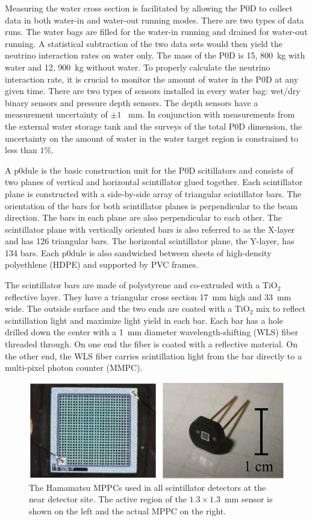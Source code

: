 Measuring the water cross section is facilitated by allowing the P0D to collect
data in both water-in and water-out running modes. There are two types of data runs. The water bags are filled
for the water-in running and drained for water-out running. A
statistical subtraction of the two data sets would then yield the neutrino
interaction rates on water only. The mass of the P0D is 15, 800~kg
with water and 12, 900~kg without water. To properly calculate the
neutrino interaction rate, it is crucial to monitor the
amount of water in the P0D at any given time. There are two types of
sensors installed in every water bag: wet/dry binary sensors and pressure depth
sensors. The depth sensors have a measurement uncertainty of $\pm
1$ ~mm. In conjunction with measurements from the external water
storage tank and the surveys of the total P0D dimension, the
uncertainty on the amount of water in the water target region is
constrained to less than $1\%$.

A p0dule is the basic
construction unit for the P0D scitillators and consists of two planes of vertical and horizontal
scintillator glued together. Each scintillator plane is constructed
with a side-by-side array of triangular scintillator bars. The
orientation of the bars for both scintillator planes is perpendicular
to the beam direction. The bars in each plane are also perpendicular
to each other. The scintillator plane with vertically oriented bars is
also referred to as the X-layer and has 126 triangular bars. The
horizontal scintillator plane, the Y-layer, has 134 bars. Each p0dule
is also sandwiched between sheets of high-density polyethlene (HDPE)
and supported by PVC frames.

The scintillator bars are made of polystyrene and co-extruded with a
TiO$_2$ reflective layer. They have a triangular cross section 17~mm
high and 33~mm wide. The outside surface and the two ends are coated
with a TiO$_2$ mix to reflect scintillation light and maximize light
yield in each bar. Each bar has a hole drilled down the center
with a 1~mm diameter wavelength-shifting (WLS) fiber threaded
through. On one end the fiber is coated with a reflective material. On
the other end, the WLS fiber carries scintillation light from the bar
directly to a multi-pixel photon counter (MMPC).

\begin{figure}
\begin{center}
\includegraphics[width=5in]{./Figures/mppc1.png}
\end{center}
\caption{The Hamamatsu MPPCs used in all scintillator detectors at
  the near detector site. The active region of the $1.3\times 1.3$~mm sensor is shown on the left and
  the actual MPPC on the right.}
\label{fig:mppc}
\end{figure}

